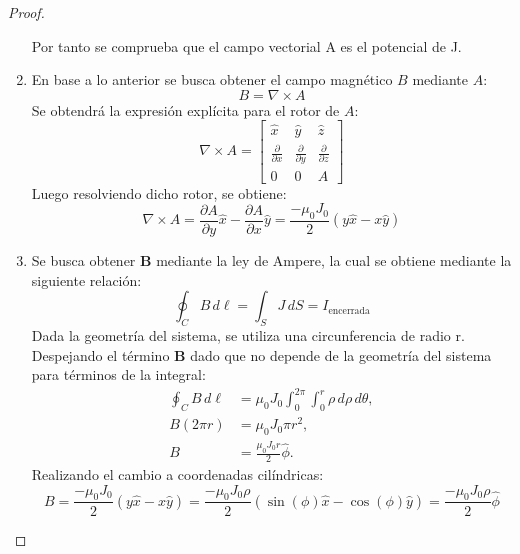 \begin{proof}
\begin{enumerate}
            Por tanto se comprueba que el campo vectorial A es el potencial de J.
        \item En base a lo anterior se busca obtener el campo magnético \(B\) mediante \(A\):
            \begin{equation}
                B = \nabla \times A
            \end{equation}
            Se obtendrá la expresión explícita para el rotor de \(A\):
            \begin{equation}
                \nabla \times A = \begin{bmatrix} \hat{x} & \hat{y} & \hat{z} \\ \frac{\partial}{\partial x} & \frac{\partial}{\partial y} & \frac{\partial}{\partial z} \\ 0 & 0 & A \end{bmatrix}
            \end{equation}
            Luego resolviendo dicho rotor, se obtiene:
            \begin{equation}
                \nabla \times A = \frac{\partial A}{\partial y} \hat{x} - \frac{\partial A}{\partial x} \hat{y} = \frac{-\mu_0 J_0}{2}(y \hat{x} - x \hat{y})
            \end{equation}
        \item Se busca obtener \textbf{B} mediante la ley de Ampere, la cual se obtiene mediante la siguiente relación:
            \begin{equation}
                \oint_C B \, d\ell = \int_S J \, dS = I_{\text{encerrada}}
            \end{equation}
            Dada la geometría del sistema, se utiliza una circunferencia de radio r. Despejando el término \textbf{B} dado que no depende de la geometría del sistema para términos de la integral:
            \begin{align}
                \oint_C B \, d\ell &= \mu_0 J_0 \int_{0}^{2\pi} \int_{0}^{r} \rho \, d\rho \, d\theta, \\
                B (2\pi r) &= \mu_0 J_0 \pi r^2, \\
                B &= \frac{\mu_0 J_0 r}{2} \hat{\phi}.
            \end{align}
            Realizando el cambio a coordenadas cilíndricas:
            \begin{equation}
                B = \frac{-\mu_0 J_0}{2}(y\hat{x} - x\hat{y}) = \frac{-\mu_0 J_0 \rho}{2}(\sin(\phi) \hat{x} - \cos(\phi) \hat{y}) = \frac{-\mu_0 J_0 \rho}{2} \hat{\phi}
            \end{equation}
    \end{enumerate}  
\end{proof}